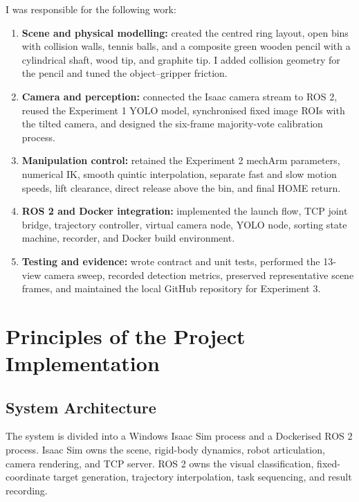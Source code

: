 \documentclass[12pt,a4paper]{article}
\begin{document}
I was responsible for the following work:

\begin{enumerate}
  \item \textbf{Scene and physical modelling:} created the centred ring layout, open bins with collision walls, tennis balls, and a composite green wooden pencil with a cylindrical shaft, wood tip, and graphite tip. I added collision geometry for the pencil and tuned the object--gripper friction.
  \item \textbf{Camera and perception:} connected the Isaac camera stream to ROS 2, reused the Experiment 1 YOLO model, synchronised fixed image ROIs with the tilted camera, and designed the six-frame majority-vote calibration process.
  \item \textbf{Manipulation control:} retained the Experiment 2 mechArm parameters, numerical IK, smooth quintic interpolation, separate fast and slow motion speeds, lift clearance, direct release above the bin, and final HOME return.
  \item \textbf{ROS 2 and Docker integration:} implemented the launch flow, TCP joint bridge, trajectory controller, virtual camera node, YOLO node, sorting state machine, recorder, and Docker build environment.
  \item \textbf{Testing and evidence:} wrote contract and unit tests, performed the 13-view camera sweep, recorded detection metrics, preserved representative scene frames, and maintained the local GitHub repository for Experiment 3.
\end{enumerate}

\section{Principles of the Project Implementation}

\subsection{System Architecture}

The system is divided into a Windows Isaac Sim process and a Dockerised ROS 2 process. Isaac Sim owns the scene, rigid-body dynamics, robot articulation, camera rendering, and TCP server. ROS 2 owns the visual classification, fixed-coordinate target generation, trajectory interpolation, task sequencing, and result recording.
\end{document}
